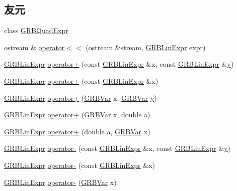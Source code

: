 \subsection*{友元}
\begin{DoxyCompactItemize}
\item 
class \hyperlink{classGRBLinExpr_a009c524a57973d6bb8fe064cf7546546}{G\+R\+B\+Quad\+Expr}
\item 
ostream \& \hyperlink{classGRBLinExpr_aad1fe067e7a53c06483bef11b7b112da}{operator$<$$<$} (ostream \&stream, \hyperlink{classGRBLinExpr}{G\+R\+B\+Lin\+Expr} expr)
\item 
\hyperlink{classGRBLinExpr}{G\+R\+B\+Lin\+Expr} \hyperlink{classGRBLinExpr_a0d1ccf674f3672f07a87ed4b9a9432c4}{operator+} (const \hyperlink{classGRBLinExpr}{G\+R\+B\+Lin\+Expr} \&x, const \hyperlink{classGRBLinExpr}{G\+R\+B\+Lin\+Expr} \&\hyperlink{classes_8txt_a52673b1e0cce0104e52dcd12727f211e}{y})
\item 
\hyperlink{classGRBLinExpr}{G\+R\+B\+Lin\+Expr} \hyperlink{classGRBLinExpr_a369f98a2a7d72242ef8f9f063c863529}{operator+} (const \hyperlink{classGRBLinExpr}{G\+R\+B\+Lin\+Expr} \&x)
\item 
\hyperlink{classGRBLinExpr}{G\+R\+B\+Lin\+Expr} \hyperlink{classGRBLinExpr_ae61d5781d4b5794478e7148411754662}{operator+} (\hyperlink{classGRBVar}{G\+R\+B\+Var} x, \hyperlink{classGRBVar}{G\+R\+B\+Var} \hyperlink{classes_8txt_a52673b1e0cce0104e52dcd12727f211e}{y})
\item 
\hyperlink{classGRBLinExpr}{G\+R\+B\+Lin\+Expr} \hyperlink{classGRBLinExpr_a0ac4e6cc05b18a223b617798c1422fc0}{operator+} (\hyperlink{classGRBVar}{G\+R\+B\+Var} x, double a)
\item 
\hyperlink{classGRBLinExpr}{G\+R\+B\+Lin\+Expr} \hyperlink{classGRBLinExpr_a362f19526ca0509aec663da3e5e57ca1}{operator+} (double a, \hyperlink{classGRBVar}{G\+R\+B\+Var} x)
\item 
\hyperlink{classGRBLinExpr}{G\+R\+B\+Lin\+Expr} \hyperlink{classGRBLinExpr_aca32b6ededf483179d4ec832f041b9bc}{operator-\/} (const \hyperlink{classGRBLinExpr}{G\+R\+B\+Lin\+Expr} \&x, const \hyperlink{classGRBLinExpr}{G\+R\+B\+Lin\+Expr} \&\hyperlink{classes_8txt_a52673b1e0cce0104e52dcd12727f211e}{y})
\item 
\hyperlink{classGRBLinExpr}{G\+R\+B\+Lin\+Expr} \hyperlink{classGRBLinExpr_a381a06d1de784c063a1558593b25d1ef}{operator-\/} (const \hyperlink{classGRBLinExpr}{G\+R\+B\+Lin\+Expr} \&x)
\item 
\hyperlink{classGRBLinExpr}{G\+R\+B\+Lin\+Expr} \hyperlink{classGRBLinExpr_a220e01acbc110d26decc3eb9b9f2f707}{operator-\/} (\hyperlink{classGRBVar}{G\+R\+B\+Var} x)

\end{DoxyCompactItemize}

